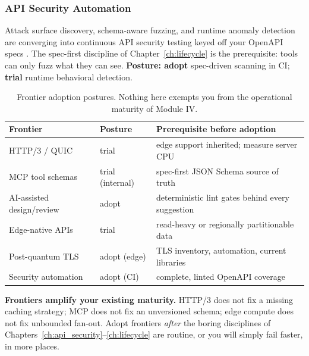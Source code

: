 \subsubsection{API Security Automation}

Attack surface discovery, schema-aware fuzzing, and runtime anomaly detection
are converging into continuous API security testing keyed off your OpenAPI
specs \cite{openapi31,owaspapisecurity}. The spec-first discipline of
Chapter~\ref{ch:lifecycle} is the prerequisite: tools can only fuzz what they
can see. \textbf{Posture: adopt} spec-driven scanning in CI;
\textbf{trial} runtime behavioral detection.

\begin{table}[htbp]
  \centering
  \small
  \begin{tabularx}{\textwidth}{l l X}
    \toprule
    \textbf{Frontier} & \textbf{Posture} & \textbf{Prerequisite before adoption} \\
    \midrule
    HTTP/3 / QUIC \cite{rfc9114,rfc9000} & trial & edge support inherited; measure server CPU \\
    MCP tool schemas & trial (internal) & spec-first JSON Schema source of truth \cite{jsonschemadocs} \\
    AI-assisted design/review & adopt & deterministic lint gates behind every suggestion \\
    Edge-native APIs & trial & read-heavy or regionally partitionable data \\
    Post-quantum TLS & adopt (edge) & TLS inventory, automation, current libraries \cite{rfc8446} \\
    Security automation & adopt (CI) & complete, linted OpenAPI coverage \cite{owaspapisecurity} \\
    \bottomrule
  \end{tabularx}
  \caption{Frontier adoption postures. Nothing here exempts you from the
  operational maturity of Module IV.}
  \label{tab:frontiers}
\end{table}

\begin{warningbox}
\textbf{Frontiers amplify your existing maturity.} HTTP/3 does not fix a
missing caching strategy; MCP does not fix an unversioned schema; edge
compute does not fix unbounded fan-out. Adopt frontiers \emph{after} the
boring disciplines of Chapters~\ref{ch:api_security}--\ref{ch:lifecycle} are
routine, or you will simply fail faster, in more places.
\end{warningbox}

